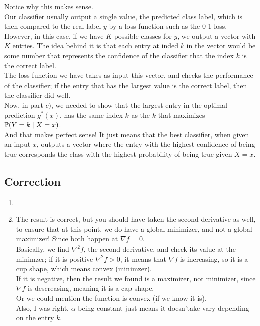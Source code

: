 \documentclass[12pt]{article}
\begin{document}
\begin{enumerate}[label=\alph*)]
    Notice why this makes sense. \\
    Our classifier usually output a single value,
    the predicted class label,
    which is then compared to the real label $y$
    by a loss function such as the 0-1 loss. \\
    However, in this case,
    if we have $K$ possible classes for $y$,
    we output a vector with $K$
    entries.
    The idea behind it is that each
    entry at inded $k$ in the vector would be
    some number that represents the confidence
    of the classifier that the index $k$
    is the correct label. \\
    The loss function we have takes as input 
    this vector, and checks the performance
    of the classifier;
    if the entry that has the largest value
    is the correct label, then the classifier
    did well. \\
    Now, in part $c)$,
    we needed to show that the largest entry
    in the optimal prediction $g^*(x)$,
    has the same index $k$
    as the $k$ that maximizes
    $\mathbb{P}(Y = k \mid X = x)$. \\
    And that makes perfect sense!
    It just means that the best classifier,
    when given an input $x$,
    outputs a vector
    where the entry with the highest
    confidence of being true corresponds
    the class with the highest probability
    of being true given $X = x$. \\
\end{enumerate}


\begingroup
\color{red}
\subsection*{Correction}
\begin{enumerate}[label=\alph*)]
    \item
    \item 
    The result is correct, but you should have
    taken the second derivative as well,
    to ensure that at this point, we do have a
    global minimizer, and not a global maximizer!
    Since both happen at $\nabla f = 0$. \\
    Basically, we find $\nabla^2 f$,
    the second derivative,
    and check its value at the minimzer;
    if it is positive $\nabla^2 f > 0$,
    it means that $\nabla f$
    is increasing, so it is a cup shape,
    which means convex (minimzer). \\
    If it is negative, then the result
    we found is a maximizer, not minimizer,
    since $\nabla f$ is descreasing,
    meaning it is a cap shape. \\
    Or we could mention the function is
    convex (if we know it is). \\
    Also, I was right,
    $\alpha$ being constant just means it doesn'take
    vary depending on the entry $k$.
\end{enumerate}
\endgroup
\end{document}

